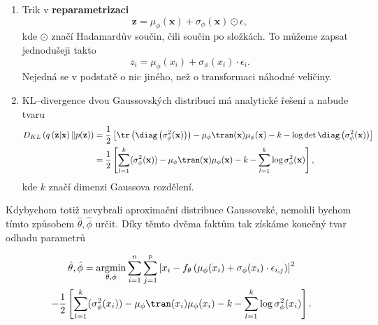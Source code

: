 \begin{enumerate}
\item Trik v \textbf{reparametrizaci}
\begin{equation}
\textbf{z} = \mu_{\phi}(\textbf{x}) + \sigma_{\phi}(\textbf{x})\odot\epsilon ,
\end{equation}
kde $\odot$ značí Hadamardův součin, čili součin po složkách.
To můžeme zapsat jednodušeji takto
\begin{equation}
z_i = \mu_{\phi}(x_i) + \sigma_{\phi}(x_i)\cdot\epsilon_i .
\end{equation}
Nejedná se v podstatě o nic jiného, než o transformaci náhodné veličiny.
\item  KL--divergence dvou Gaussovských distribucí má analytické řešení a nabude tvaru
\begin{equation}
\begin{split}
 D_{KL}\left(q\left(\textbf{z}\vert \textbf{x} \right) \Vert p(\textbf{z})\right) & = \frac{1}{2}\left[\tr\left(\diag\left(\sigma_{\phi}^2(\textbf{x})\right)\right) - \mu_{\phi}\tran(\textbf{x})\mu_{\phi}(\textbf{x}) - k - \log\det \diag\left(\sigma_{\phi}^2(\textbf{x})   \right)\right] \\
 & = \frac{1}{2}\left[\sum_{l = 1}^k(\sigma_{\phi}^2(\textbf{x})) -\mu_\phi\tran(\textbf{x})\mu_{\phi}(\textbf{x}) - k - \sum_{l = 1}^k\log\sigma_{\phi}^2(\textbf{x})    \right],
\end{split}
\end{equation}
kde $k$ značí dimenzi Gaussova rozdělení. 
\end{enumerate}

Kdybychom totiž nevybrali aproximační distribuce Gaussovské, nemohli bychom tímto způsobem $\hat{\theta},\hat{\phi}$ určit. Díky těmto dvěma faktům tak získáme konečný tvar odhadu parametrů

\begin{multline}\label{řešení_VAE}
 \hat{\theta},\hat{\phi}   = \argmin_{\theta, \phi}\sum_{i = 1}^n\sum_{j = 1}^p \left[ x_i - f_\theta \left(\mu_{\phi}(x_i) + \sigma_{\phi}(x_i)\cdot\epsilon_{i,j}  \right)        \right] ^2  \\ -   \frac{1}{2}\left[\sum_{l = 1}^k(\sigma^2_{\phi}(x_i)) -\mu_{\phi}\tran(x_i)\mu_{\phi}(x_i) - k - \sum_{l = 1}^k\log\sigma^2_{\phi}(x_i)   \right] .
\end{multline}

